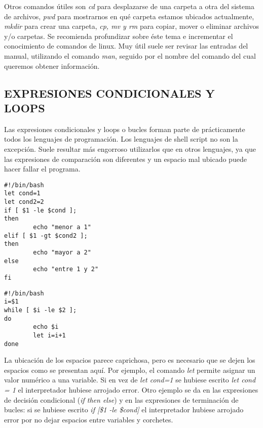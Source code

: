 Otros comandos útiles son \textit{cd} para desplazarse de una carpeta a otra del sistema de archivos, \textit{pwd} para mostrarnos
en qué carpeta estamos ubicados actualmente, \textit{mkdir} para crear una carpeta, \textit{cp, mv y rm} para copiar, mover o eliminar
archivos y/o carpetas. Se recomienda profundizar sobre éste tema e incrementar el conocimiento de comandos de linux. Muy útil suele ser revisar
las entradas del manual, utilizando el comando \textit{man}, seguido por el nombre del comando del cual queremos obtener información.

\subsection{EXPRESIONES CONDICIONALES Y LOOPS}

Las expresiones condicionales y loops o bucles forman parte de prácticamente todos los lenguajes de programación. Los lenguajes de shell script
no son la excepción. Suele resultar más engorroso utilizarlos que en otros lenguajes, ya que las expresiones de comparación son diferentes
y un espacio mal ubicado puede hacer fallar el programa.
\begin{lstlisting}
#!/bin/bash
let cond=1
let cond2=2
if [ $1 -le $cond ];
then
        echo "menor a 1"
elif [ $1 -gt $cond2 ];
then
        echo "mayor a 2"
else
        echo "entre 1 y 2"
fi
\end{lstlisting}
\begin{lstlisting}
#!/bin/bash
i=$1
while [ $i -le $2 ];
do
        echo $i
        let i=i+1
done
\end{lstlisting}

La ubicación de los espacios parece caprichosa, pero es necesario que se dejen los espacios como se presentan aquí. Por ejemplo, el comando
\textit{let}
permite asignar un valor numérico a una variable. Si en vez de \textit{let cond=1} se hubiese escrito \textit{let cond = 1} el interpretador
hubiese arrojado error. Otro ejemplo se da en las expresiones de decisión condicional (\textit{if then else}) y  en las expresiones de terminación
de bucles: si se hubiese escrito \textit{if [\$1 -le \$cond]} el interpretador hubiese arrojado error por no dejar espacios entre variables y
corchetes.

